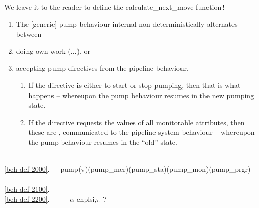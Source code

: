 \noindent\LLLL
\begynd
\pind We leave it to the reader to define the
      \textsf{calculate\_next\_move} function\,!
\afslut

\HHHH

\begin{enumerate}\setei
\item \label{beh-def-2000} The [generic] pump behaviour internal
                           non-deterministically alternates between 
\item \label{beh-def-2100} doing own work (...),  or
\item \label{beh-def-2200} accepting pump directives from the pipeline
                           behaviour.
\begin{enumerate} 
\item \label{beh-def-2300} If the directive is either to start or stop
  pumping, then that is what happens -- whereupon the pump behaviour
  resumes in the new pumping state.
\item \label{beh-def-2400} If the directive requests the values of all
  monitorable attributes, then these are , communicated
  to the pipeline system behaviour -- whereupon the pump behaviour
  resumes in the ``old'' state. 
\end{enumerate} 
\savei\end{enumerate}
\mnewfoil
\bp
{}\\
\ref{beh-def-2000}.\ \ \ pump($\pi$)(pump\_mer)(pump\_sta)(pump\_mon)(pump\_prgr) {\IS}\ \ \ \\
\ref{beh-def-2100}.\ \ \ \ \ \ {\DOTDOTDOT}\\
\ref{beh-def-2200}.\ \ \ \ \ {\NONDETCHOICE}  $\alpha$ {\EQ} ch{\LBRACKET}{\LBRACE}plsi,$\pi${\RBRACE}{\RBRACKET} ? \\
